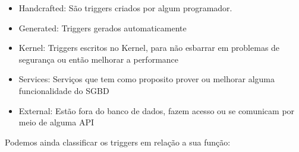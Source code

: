\documentclass[conference]{IEEEtran}
\begin{document}
    \begin{itemize}
        \item{Handcrafted}: São triggers criados por algum programador.
        \item{Generated}: Triggers gerados automaticamente
        \item{Kernel}: Triggers escritos no Kernel, para não esbarrar em problemas de segurança ou então melhorar a performance
        \item{Services}: Serviços que tem como proposito prover ou melhorar alguma funcionalidade do SGBD
        \item{External}: Estão fora do banco de dados, fazem acesso ou se comunicam por meio de alguma API
    \end{itemize}

    Podemos ainda classificar os triggers em relação a sua função:
\end{document}
